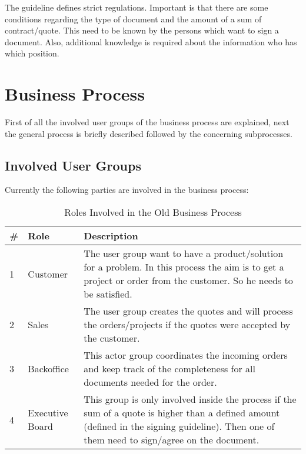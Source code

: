 The guideline defines strict regulations. Important is that there are some conditions regarding the type of document and the amount of a sum of contract/quote. This need to be known by the persons which want to sign a document. Also, additional knowledge is required about the information who has which position.

\section{Business Process} \label{sec:bp}
First of all the involved user groups of the business process are explained, next the general process is briefly described followed by the concerning subprocesses.

\subsection*{Involved User Groups}
Currently the following parties are involved in the business process: 
\begin{table}[h]
	\begin{tabular}{|p{0.25cm}|p{2cm}|p{14cm}|} \hline
		\rowcolor{Gray}\# & Role & Description \\ \hline
		1 & Customer & The user group want to have a product/solution for a problem. In this process the aim is to get a project or order from the customer. So he needs to be satisfied. \\ \hline
		2 & Sales & The user group creates the quotes and will process the orders/projects if the quotes were accepted by the customer. \\ \hline
		3 & Backoffice & This actor group coordinates the incoming orders and keep track of the completeness for all documents needed for the order. \\ \hline
		4 & Executive Board & This group is only involved inside the process if the sum of a quote is higher than a defined amount (defined in the signing guideline). Then one of them need to sign/agree on the document. \\ \hline
	\end{tabular}
	\caption{Roles Involved in the Old Business Process}
	\label{tab:bpRoles}
\end{table}

